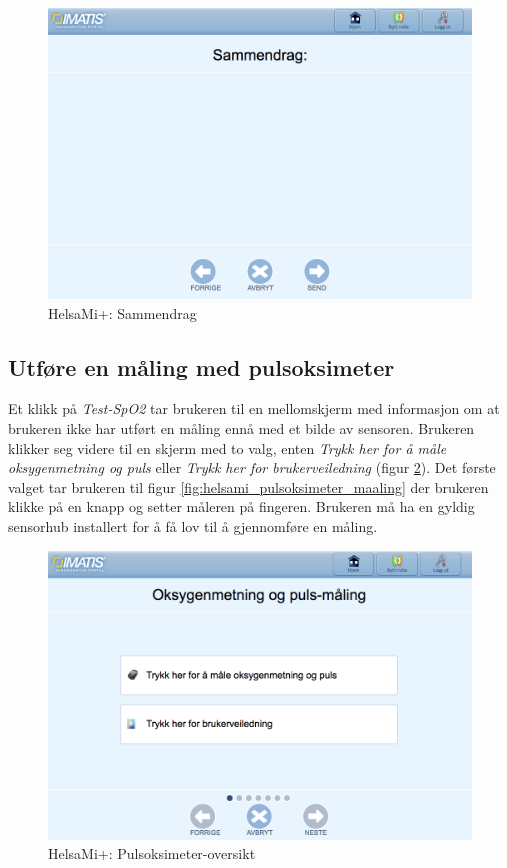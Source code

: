 \begin{figure}
\includegraphics[width=1.0\textwidth,center]{fig/helsami/kols_sammendrag}
\caption{HelsaMi+: Sammendrag}
\label{fig:helsami_kols_sammendrag}
\end{figure}

\subsection{Utføre en måling med pulsoksimeter}
Et klikk på \textit{Test-SpO2} tar brukeren til en mellomskjerm med informasjon om at
brukeren ikke har utført en måling ennå med et bilde av sensoren. Brukeren klikker seg videre
til en skjerm med to valg, enten \textit{Trykk her for å måle oksygenmetning og puls} eller \textit{Trykk her for brukerveiledning}
(figur \ref{fig:helsami_pulsoksimeter_oversikt}). Det første valget tar brukeren til figur \ref{fig:helsami_pulsoksimeter_maaling}
der brukeren klikke på en knapp og setter måleren på fingeren. Brukeren må ha en gyldig sensorhub installert for
å få lov til å gjennomføre en måling.

\begin{figure}
\includegraphics[width=1.0\textwidth,center]{fig/helsami/pulsoksimeter_oversikt}
\caption{HelsaMi+: Pulsoksimeter-oversikt}
\label{fig:helsami_pulsoksimeter_oversikt}
\end{figure}

